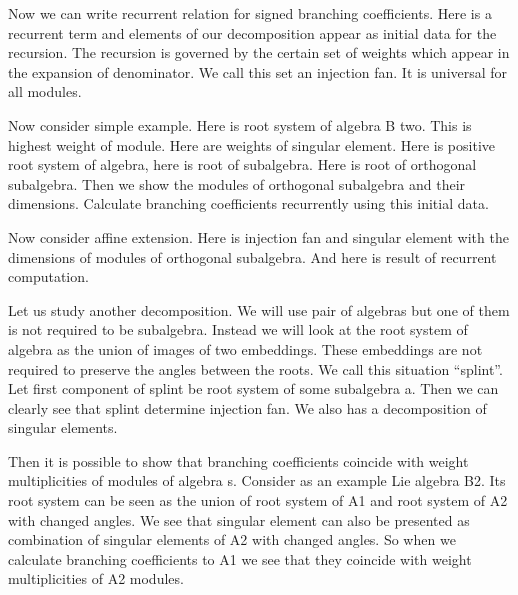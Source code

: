 \documentclass[a4paper]{article}
\begin{document}
Now we can write recurrent relation for signed branching coefficients. Here is a recurrent term and elements of our decomposition appear as initial data for the recursion. The recursion is governed by the certain set of weights which appear in the expansion of denominator. We call this set an injection fan. It is universal for all modules. 

Now consider simple example. Here is root system of algebra B two. This is highest weight of module. Here are weights of singular element. Here is positive root system of algebra, here is root of subalgebra. Here is root of orthogonal subalgebra. Then we show the modules of orthogonal subalgebra and their dimensions. Calculate branching coefficients recurrently using this initial data. 

Now consider affine extension. Here is injection fan and singular element with the dimensions of modules of orthogonal subalgebra. And here is result of recurrent computation. 

Let us study another decomposition. We will use pair of algebras but one of them is not required to be subalgebra. Instead we will look at the root system of algebra as the union of images of two embeddings. These embeddings are not required to preserve the angles between the roots. We call this situation ``splint''. Let first component of splint be root system of some subalgebra a. Then we can clearly see that splint determine injection fan. We also has a decomposition of singular elements. 

Then it is possible to show that branching coefficients coincide with weight multiplicities of modules of algebra s. Consider as an example Lie algebra B2. Its root system can be seen as the union of root system of A1 and root system of A2 with changed angles. We see that singular element can also be presented as combination of singular elements of A2 with changed angles. So when we calculate branching coefficients to A1 we see that they coincide with weight multiplicities of A2 modules. 
\end{document}
